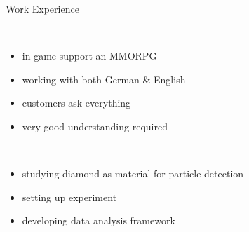\begin{frame}[t]{Work Experience}\centering\vspace*{5mm}
%
  \begin{minipage}[c][.8\textheight][t]{.45\textwidth}\centering
    \\[4ex]
    \vspace*{5ex}
    \begin{itemize}\itemspace{2ex}
      \item in-game support an MMORPG
      \item working with both German \& English
      \item customers ask everything
      \item very good understanding required
    \end{itemize}
  \end{minipage}
%
  \begin{minipage}[c][.8\textheight][t]{.45\textwidth}\centering
    \\[2ex]
    \vspace*{4ex}
    \begin{itemize}\itemspace{2ex}
      \item studying diamond as material for particle detection
      \item setting up experiment
      \item developing data analysis framework
    \end{itemize}
  \end{minipage}
%
\end{frame}

